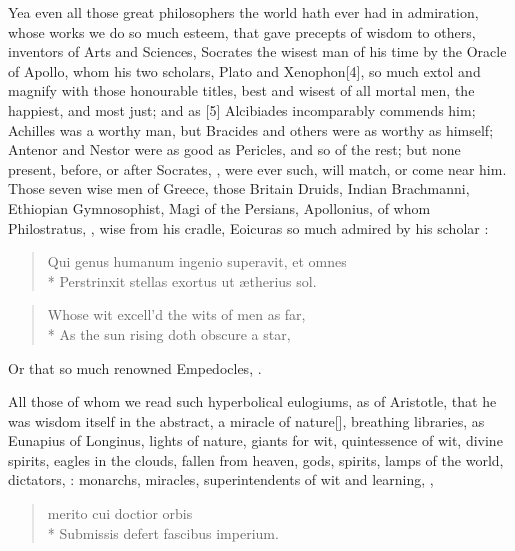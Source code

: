{Yea even all those great philosophers the world hath ever had in
admiration, whose works we do so much esteem, that gave precepts of
wisdom to others, inventors of Arts and Sciences, Socrates the wisest
man of his time by the Oracle of Apollo, whom his two scholars,
Plato and Xenophon[4\baselineskip], so much extol and magnify with those
honourable titles, best and wisest of all mortal men, the happiest, and
most just; and as [5\baselineskip] Alcibiades incomparably commends him; Achilles
was a worthy man, but Bracides and others were as worthy as himself;
Antenor and Nestor were as good as Pericles, and so of the rest; but
none present, before, or after Socrates, , were ever such, will match, or come near him. Those seven
wise men of Greece, those Britain Druids, Indian Brachmanni, Ethiopian
Gymnosophist, Magi of the Persians, Apollonius, of whom Philostratus,
, wise from his cradle, Eoicuras so much
admired by his scholar \Lucretius{}:
%
\begin{latin}
\begin{verse}
Qui genus humanum ingenio superavit, et omnes\\*
Perstrinxit stellas exortus ut \ae{}therius sol.
\end{verse}
\end{latin}
\translationrule%
\begin{verse}
Whose wit excell'd the wits of men as far,\\*
As the sun rising doth obscure a star,
\end{verse}

Or that so much renowned Empedocles, .

All those of whom we read such hyperbolical eulogiums, as of
Aristotle, that he was wisdom itself in the abstract, a miracle of
nature[\baselineskip], breathing libraries, as Eunapius of Longinus, lights of nature,
giants for wit, quintessence of wit, divine spirits, eagles in the
clouds, fallen from heaven, gods, spirits, lamps of the world,
dictators, : monarchs, miracles,
superintendents of wit and learning, ,
%
\begin{latin}
\begin{verse}
merito cui doctior orbis\\*
Submissis defert fascibus imperium.
\end{verse}
\end{latin}

}
